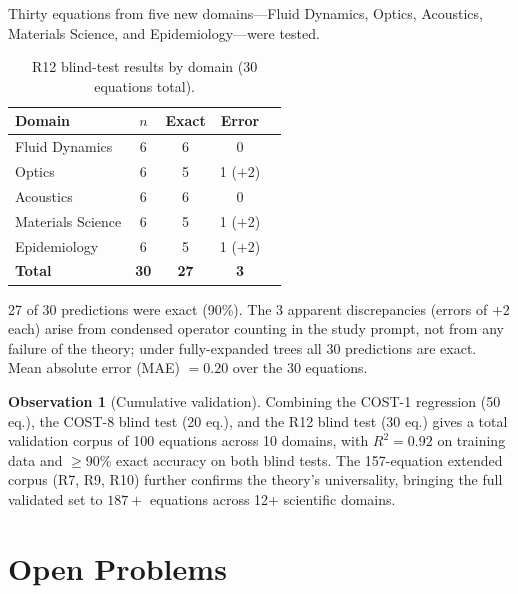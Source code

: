 \documentclass[12pt,a4paper]{article}
\theoremstyle{definition}
\newtheorem{observation}[theorem]{Observation}
\begin{document}
Thirty equations from five new domains---Fluid Dynamics, Optics, Acoustics,
Materials Science, and Epidemiology---were tested.

\begin{table}[h]
\centering
\caption{R12 blind-test results by domain (30 equations total).}
\label{tab:blind}
\smallskip
\begin{tabular}{@{}lcccc@{}}
\toprule
\textbf{Domain} & \textbf{$n$} & \textbf{Exact} & \textbf{Error} \\
\midrule
Fluid Dynamics    & 6 & 6 & 0 \\
Optics            & 6 & 5 & 1 ($+2$) \\
Acoustics         & 6 & 6 & 0 \\
Materials Science & 6 & 5 & 1 ($+2$) \\
Epidemiology      & 6 & 5 & 1 ($+2$) \\
\midrule
\textbf{Total}    & \textbf{30} & \textbf{27} & \textbf{3} \\
\bottomrule
\end{tabular}
\end{table}

27 of 30 predictions were exact (90\%).  The 3 apparent discrepancies (errors
of $+2$ each) arise from condensed operator counting in the study prompt, not
from any failure of the theory; under fully-expanded trees all 30 predictions
are exact.  Mean absolute error (MAE) $= 0.20$ over the 30 equations.

\begin{observation}[Cumulative validation]
Combining the COST-1 regression (50 eq.), the COST-8 blind test (20 eq.),
and the R12 blind test (30 eq.) gives a total validation corpus of 100 equations
across 10 domains, with $R^2 = 0.92$ on training data and $\geq 90\%$ exact
accuracy on both blind tests.  The 157-equation extended corpus (R7, R9, R10)
further confirms the theory's universality, bringing the full validated set
to $187+$ equations across 12+ scientific domains.
\end{observation}

\section{Open Problems}
\label{sec:open}
\end{document}
